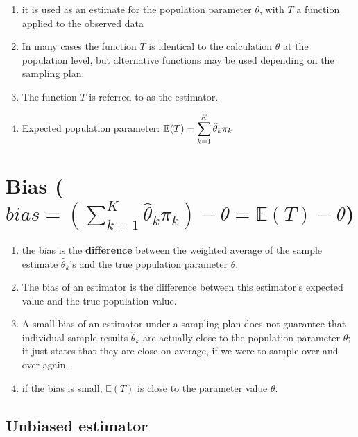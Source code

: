 \begin{enumerate}
    \item it is used as an estimate for the population parameter $\theta$, with $T$ a function applied to the observed data

    \item In many cases the function $T$ is identical to the calculation $\theta$ at the population level, but alternative functions may be used depending on the sampling plan.

    \item The function $T$ is referred to as the estimator.

    \item Expected population parameter: $\mathbb{E}(T) = \displaystyle\sum_{k=1}^{K} \hat{\theta}_k\pi_k$
\end{enumerate}


\section{
Bias (${
    bias = ( \sum_{k=1}^{K} \hat{\theta}_k\pi_k )
     - \theta = \mathbb{E}(T) - \theta
}$) 
\cite{ism-1}}\label{sampling plans: Bias}

\begin{enumerate}
    \item the bias is the \textbf{difference} between the weighted average of the sample estimate $\hat{\theta}_k$’s and the true population parameter $\theta$.

    \item The bias of an estimator is the difference between this estimator’s expected value and the true population value.

    \item A small bias of an estimator under a sampling plan does not guarantee that individual sample results $\hat{\theta}_k$ are actually close to the population parameter $\theta$; it just states that they are close on average, if we were to sample over and over again.

    \item if the bias is small, $\mathbb{E}(T)$ is close to the parameter value $\theta$.

    
\end{enumerate}

\subsection{Unbiased estimator} \label{Unbiased estimator}

